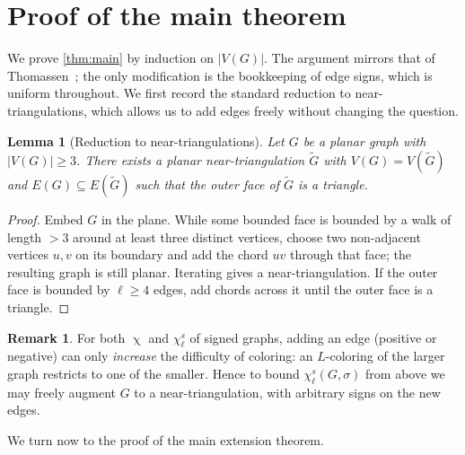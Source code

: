 \documentclass[11pt,a4paper]{article}
\theoremstyle{plain}
\newtheorem{lemma}[theorem]{Lemma}
\theoremstyle{definition}
\newtheorem{remark}[theorem]{Remark}
\newcommand{\E}{E}
\newcommand{\V}{V}
\DeclareMathOperator{\chia}{\chi}
\newcommand{\chs}{\chi_{\ell}^{s}}
\newcommand{\Gs}{(G,\sigma)}
\begin{document}
\section{Proof of the main theorem}\label{sec:proof}

We prove \cref{thm:main} by induction on $|\V(G)|$. The argument
mirrors that of Thomassen~\cite{Thomassen1994}; the only modification
is the bookkeeping of edge signs, which is uniform throughout. We
first record the standard reduction to near-triangulations, which
allows us to add edges freely without changing the question.

\begin{lemma}[Reduction to near-triangulations]\label{lem:reduce-tri}
Let $G$ be a planar graph with $|\V(G)|\ge 3$. There exists a planar
near-triangulation $\widetilde G$ with $\V(G)=\V(\widetilde G)$ and
$\E(G)\subseteq \E(\widetilde G)$ such that the outer face of
$\widetilde G$ is a triangle.
\end{lemma}

\begin{proof}
Embed $G$ in the plane. While some bounded face is bounded by a
walk of length $>3$ around at least three distinct vertices, choose
two non-adjacent vertices $u,v$ on its boundary and add the chord
$uv$ through that face; the resulting graph is still planar.
Iterating gives a near-triangulation. If the outer face is bounded
by $\ell\ge 4$ edges, add chords across it until the outer face is
a triangle.
\end{proof}

\begin{remark}\label{rmk:edges-only-help}
For both $\chia$ and $\chs$ of signed graphs, adding an edge
(positive or negative) can only \emph{increase} the difficulty of
coloring: an $L$-coloring of the larger graph restricts to one of
the smaller. Hence to bound $\chs\Gs$ from above we may freely
augment $G$ to a near-triangulation, with arbitrary signs on the
new edges.
\end{remark}

We turn now to the proof of the main extension theorem.
\end{document}
